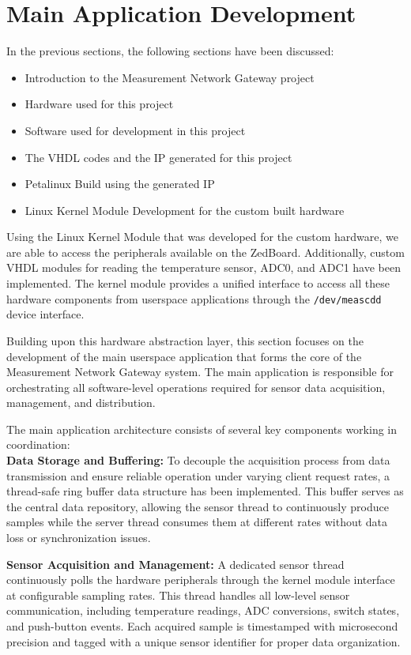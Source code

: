

\section{Main Application Development}

In the previous sections, the following sections have been discussed: 
\begin{itemize}
	\item Introduction to the Measurement Network Gateway project
	\item Hardware used for this project
	\item Software used for development in this project
	\item The VHDL codes and the IP generated for this project
	\item Petalinux Build using the generated IP
	\item Linux Kernel Module Development for the custom built hardware
\end{itemize}

Using the Linux Kernel Module that was developed for the custom hardware, we are able to access the peripherals available on the ZedBoard. Additionally, custom VHDL modules for reading the temperature sensor, ADC0, and ADC1 have been implemented. The kernel module provides a unified interface to access all these hardware components from userspace applications through the \texttt{/dev/meascdd} device interface.

Building upon this hardware abstraction layer, this section focuses on the development of the main userspace application that forms the core of the Measurement Network Gateway system. The main application is responsible for orchestrating all software-level operations required for sensor data acquisition, management, and distribution.

The main application architecture consists of several key components working in coordination:\\

\textbf{Data Storage and Buffering:} To decouple the acquisition process from data transmission and ensure reliable operation under varying client request rates, a thread-safe ring buffer data structure has been implemented. This buffer serves as the central data repository, allowing the sensor thread to continuously produce samples while the server thread consumes them at different rates without data loss or synchronization issues.

\textbf{Sensor Acquisition and Management:} A dedicated sensor thread continuously polls the hardware peripherals through the kernel module interface at configurable sampling rates. This thread handles all low-level sensor communication, including temperature readings, ADC conversions, switch states, and push-button events. Each acquired sample is timestamped with microsecond precision and tagged with a unique sensor identifier for proper data organization.




